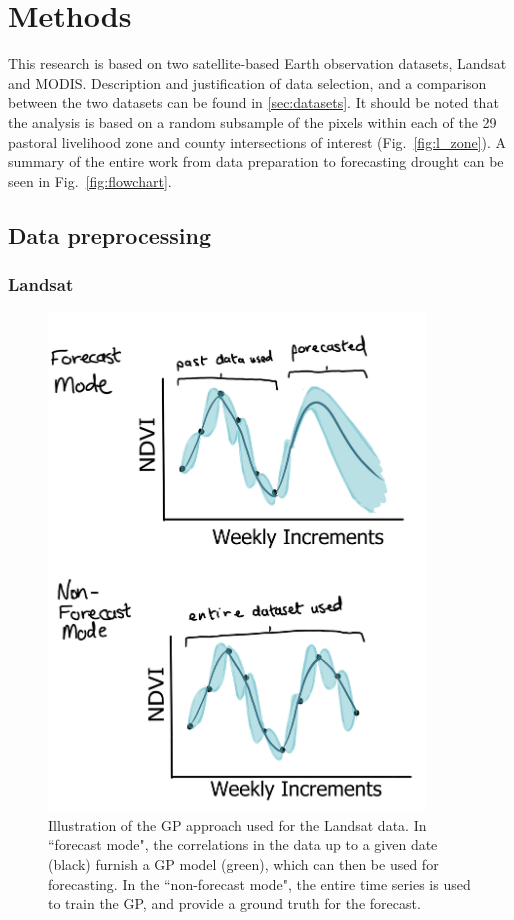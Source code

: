 \documentclass[review]{elsarticle}
\begin{document}
\section{Methods} \label{sec:methods}
This research is based on two satellite-based Earth observation datasets, Landsat and MODIS. Description and justification of data selection, and a comparison between the two datasets can be found in \ref{sec:datasets}. It should be noted that the analysis is based on a random subsample of the pixels within each of the 29 pastoral livelihood zone and county intersections of interest (Fig.~\ref{fig:l_zone}). A summary of the entire work from data preparation to forecasting drought can be seen in Fig.~\ref{fig:flowchart}.


\subsection{Data preprocessing} \label{sec:preprocessing}

\subsubsection{Landsat}
\begin{figure}
\label{review:GP_sketch}
    \centering
    \includegraphics[width=10cm]{figures/Barrett2019sketch2-GP.png}
    \caption{Illustration of the GP approach used for the Landsat data. In ``forecast mode", the correlations in the data up to a given date (black) furnish a GP model (green), which can then be used for forecasting. In the ``non-forecast mode", the entire time series is used to train the GP, and provide a ground truth for the forecast.}
    \label{fig:GP_illustration}
\end{figure}
\end{document}
